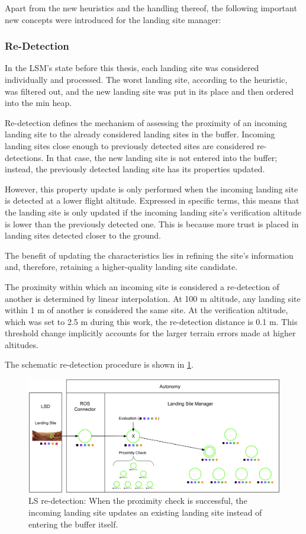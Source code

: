 Apart from the new heuristics and the handling thereof, the following important new concepts were introduced for the landing site manager:

\subsubsection{Re-Detection}\label{subsubsec:redetection}

In the LSM's state before this thesis, each landing site was considered individually and processed. The worst landing site, according to the heuristic, was filtered out, and the new landing site was put in its place and then ordered into the min heap.

Re-detection defines the mechanism of assessing the proximity of an incoming landing site to the already considered landing sites in the buffer. Incoming landing sites close enough to previously detected sites are considered re-detections. In that case, the new landing site is not entered into the buffer; instead, the previously detected landing site has its properties updated.

However, this property update is only performed when the incoming landing site is detected at a lower flight altitude. Expressed in specific terms, this means that the landing site is only updated if the incoming landing site's verification altitude is lower than the previously detected one. This is because more trust is placed in landing sites detected closer to the ground. 

The benefit of updating the characteristics lies in refining the site's information and, therefore, retaining a higher-quality landing site candidate.

The proximity within which an incoming site is considered a re-detection of another is determined by linear interpolation. At 100 m altitude, any landing site within 1 m of another is considered the same site. At the verification altitude, which was set to 2.5 m during this work, the re-detection distance is 0.1 m. This threshold change implicitly accounts for the larger terrain errors made at higher altitudes. 

The schematic re-detection procedure is shown in \cref{fig:ls_redetection}.

\begin{figure}[h]
\centering
\includegraphics[scale=0.16]{images/autonomous_landing/re-detection.png}
\caption{LS re-detection: When the proximity check is successful, the incoming landing site updates an existing landing site instead of entering the buffer itself.}
\label{fig:ls_redetection}
\end{figure}

